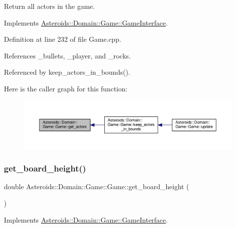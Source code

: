 Return all actors in the game. 



Implements \hyperlink{classAsteroids_1_1Domain_1_1Game_1_1GameInterface_af5bd347cdac153a538ad7d88e3473693}{Asteroids\+::\+Domain\+::\+Game\+::\+Game\+Interface}.



Definition at line 232 of file Game.\+cpp.



References \+\_\+bullets, \+\_\+player, and \+\_\+rocks.



Referenced by keep\+\_\+actors\+\_\+in\+\_\+bounds().

Here is the caller graph for this function\+:\nopagebreak
\begin{figure}[H]
\begin{center}
\leavevmode
\includegraphics[width=350pt]{classAsteroids_1_1Domain_1_1Game_1_1Game_af6a7d82ef71615d83aba515a07487641_icgraph}
\end{center}
\end{figure}
\mbox{\label{classAsteroids_1_1Domain_1_1Game_1_1Game_ab7a8ccde8006ddaa3037f1d1964fba5e}} 
\subsubsection{\texorpdfstring{get\+\_\+board\+\_\+height()}{get\_board\_height()}}
{\footnotesize\ttfamily double Asteroids\+::\+Domain\+::\+Game\+::\+Game\+::get\+\_\+board\+\_\+height (\begin{DoxyParamCaption}{ }\end{DoxyParamCaption})\hspace{0.3cm}{\ttfamily [virtual]}}



Implements \hyperlink{classAsteroids_1_1Domain_1_1Game_1_1GameInterface_a27ad37addb00549ed5123b128edf8edb}{Asteroids\+::\+Domain\+::\+Game\+::\+Game\+Interface}.



